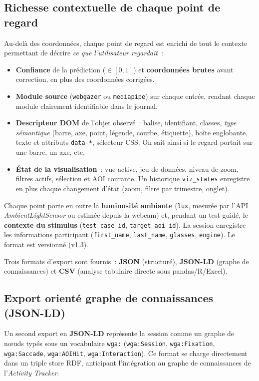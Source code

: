 \documentclass[11pt,a4paper]{article}
\newcommand{\code}[1]{\texttt{\small #1}}
\begin{document}
\subsection{Richesse contextuelle de chaque point de regard}
\label{sec:richesse}

Au-delà des coordonnées, chaque point de regard est enrichi de tout le contexte
permettant de décrire \emph{ce que l'utilisateur regardait}~:

\begin{itemize}[leftmargin=1.4em]
  \item \textbf{Confiance} de la prédiction ($\in[0,1]$) et \textbf{coordonnées
  brutes} avant correction, en plus des coordonnées corrigées.
  \item \textbf{Module source} (\code{webgazer} ou \code{mediapipe}) sur chaque
  entrée, rendant chaque module clairement identifiable dans le journal.
  \item \textbf{Descripteur DOM} de l'objet observé~: balise, identifiant, classes,
  \emph{type sémantique} (barre, axe, point, légende, courbe, étiquette), boîte
  englobante, texte et attributs \code{data-*}, sélecteur CSS. On sait ainsi si le
  regard portait sur une barre, un axe, etc.
  \item \textbf{État de la visualisation}~: vue active, jeu de données, niveau de
  zoom, filtres actifs, sélection et AOI courante. Un historique \code{viz\_states}
  enregistre en plus chaque changement d'état (zoom, filtre par trimestre, onglet).
\end{itemize}

Chaque point porte en outre la \textbf{luminosité ambiante} (\code{lux}, mesurée par
l'API \textit{AmbientLightSensor} ou estimée depuis la webcam) et, pendant un test
guidé, le \textbf{contexte du stimulus} (\code{test\_case\_id}, \code{target\_aoi\_id}).
La session enregistre les informations participant (\code{first\_name},
\code{last\_name}, \code{glasses}, \code{engine}). Le format est versionné (v1.3).

Trois formats d'export sont fournis~: \textbf{JSON} (structuré), \textbf{JSON-LD}
(graphe de connaissances) et \textbf{CSV} (analyse tabulaire directe sous
pandas/R/Excel).

\subsection{Export orienté graphe de connaissances (JSON-LD)}

Un second export en \textbf{JSON-LD} représente la session comme un graphe de
nœuds typés sous un vocabulaire \code{wga:} (\code{wga:Session}, \code{wga:Fixation},
\code{wga:Saccade}, \code{wga:AOIHit}, \code{wga:Interaction}). Ce format se charge
directement dans un triple store RDF, anticipant l'intégration au graphe de
connaissances de l'\textit{Activity Tracker}.
\end{document}
